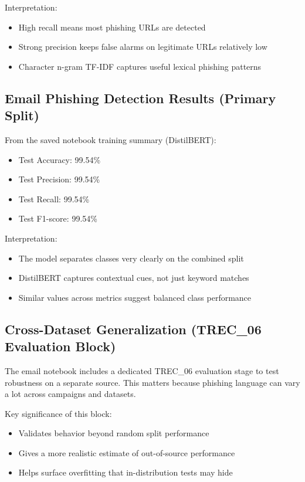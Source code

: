 \documentclass[12pt]{article}
\begin{document}
\noindent Interpretation:
\begin{itemize}
    \item High recall means most phishing URLs are detected
    \item Strong precision keeps false alarms on legitimate URLs relatively low
    \item Character n-gram TF-IDF captures useful lexical phishing patterns
\end{itemize}

\subsection{Email Phishing Detection Results (Primary Split)}
From the saved notebook training summary (DistilBERT):
\begin{itemize}
    \item Test Accuracy: 99.54\%
    \item Test Precision: 99.54\%
    \item Test Recall: 99.54\%
    \item Test F1-score: 99.54\%
\end{itemize}

\noindent Interpretation:
\begin{itemize}
    \item The model separates classes very clearly on the combined split
    \item DistilBERT captures contextual cues, not just keyword matches
    \item Similar values across metrics suggest balanced class performance
\end{itemize}

\subsection{Cross-Dataset Generalization (TREC\_06 Evaluation Block)}
The email notebook includes a dedicated TREC\_06 evaluation stage to test robustness on a separate source. This matters because phishing language can vary a lot across campaigns and datasets.

\noindent Key significance of this block:
\begin{itemize}
    \item Validates behavior beyond random split performance
    \item Gives a more realistic estimate of out-of-source performance
    \item Helps surface overfitting that in-distribution tests may hide
\end{itemize}
\end{document}
